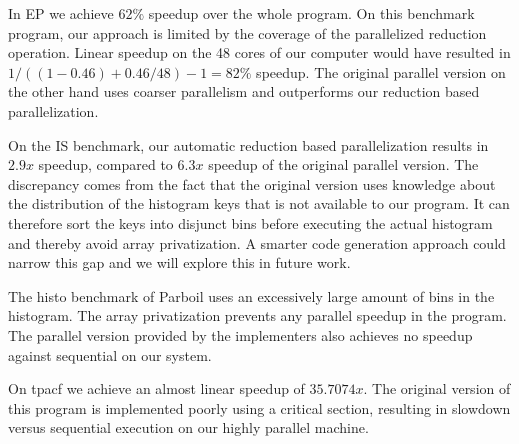 In EP we achieve $62\%$ speedup over the whole program.
On this benchmark program, our approach is limited by the coverage of the parallelized reduction operation.
Linear speedup on the 48 cores of our computer would have resulted in $1/((1-0.46)+0.46/48)-1=82\%$ speedup.
The original parallel version on the other hand uses coarser parallelism and outperforms our reduction based parallelization.

On the IS benchmark, our automatic reduction based parallelization results in $2.9x$ speedup, compared to $6.3x$ speedup of the original parallel version.
The discrepancy comes from the fact that the original version uses knowledge about the distribution of the histogram keys that is not available to our program.
It can therefore sort the keys into disjunct bins before executing the actual histogram and thereby avoid array privatization.
A smarter code generation approach could narrow this gap and we will explore this in future work.

The histo benchmark of Parboil uses an excessively large amount of bins in the histogram.
The array privatization prevents any parallel speedup in the program.
The parallel version provided by the implementers also achieves no speedup against sequential on our system.


On tpacf we achieve an almost linear speedup of $35.7074x$.
The original version of this program is implemented poorly using a critical section, resulting in slowdown versus sequential execution on our highly parallel machine.%

